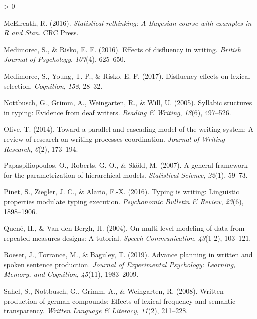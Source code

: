 \documentclass[
  english,
  man,mask,floatsintext]{apa7}
\newlength{\cslhangindent}
\newenvironment{CSLReferences}[2] %
 {%
  \setlength{\parindent}{0pt}
  \ifodd #1 \everypar{\setlength{\hangindent}{\cslhangindent}}\ignorespaces\fi
  \ifnum #2 > 0
  \setlength{\parskip}{#2\baselineskip}
  \fi
 }%
 {}
\begin{document}
\begin{CSLReferences}{1}{0}
\leavevmode\hypertarget{ref-mcelreath2016statistical}{}%
McElreath, R. (2016). \emph{Statistical rethinking: {A} {B}ayesian course with examples in {R} and {Stan}}. CRC Press.

\leavevmode\hypertarget{ref-medimorec2016effects}{}%
Medimorec, S., \& Risko, E. F. (2016). Effects of disfluency in writing. \emph{British Journal of Psychology}, \emph{107}(4), 625--650.

\leavevmode\hypertarget{ref-medimorec2017disfluency}{}%
Medimorec, S., Young, T. P., \& Risko, E. F. (2017). Disfluency effects on lexical selection. \emph{Cognition}, \emph{158}, 28--32.

\leavevmode\hypertarget{ref-not05}{}%
Nottbusch, G., Grimm, A., Weingarten, R., \& Will, U. (2005). Syllabic sructures in typing: Evidence from deaf writers. \emph{Reading \& Writing}, \emph{18}(6), 497--526.

\leavevmode\hypertarget{ref-olive2014toward}{}%
Olive, T. (2014). Toward a parallel and cascading model of the writing system: {A} review of research on writing processes coordination. \emph{Journal of Writing Research}, \emph{6}(2), 173--194.

\leavevmode\hypertarget{ref-papaspiliopoulos2007general}{}%
Papaspiliopoulos, O., Roberts, G. O., \& Sköld, M. (2007). A general framework for the parametrization of hierarchical models. \emph{Statistical Science}, \emph{22}(1), 59--73.

\leavevmode\hypertarget{ref-pinet2016typing}{}%
Pinet, S., Ziegler, J. C., \& Alario, F.-X. (2016). Typing is writing: Linguistic properties modulate typing execution. \emph{Psychonomic Bulletin \& Review}, \emph{23}(6), 1898--1906.

\leavevmode\hypertarget{ref-quene2004multi}{}%
Quené, H., \& Van den Bergh, H. (2004). On multi-level modeling of data from repeated measures designs: A tutorial. \emph{Speech Communication}, \emph{43}(1-2), 103--121.

\leavevmode\hypertarget{ref-roeser2019advance}{}%
Roeser, J., Torrance, M., \& Baguley, T. (2019). Advance planning in written and spoken sentence production. \emph{Journal of Experimental Psychology: Learning, Memory, and Cognition}, \emph{45}(11), 1983--2009.

\leavevmode\hypertarget{ref-sah08}{}%
Sahel, S., Nottbusch, G., Grimm, A., \& Weingarten, R. (2008). Written production of german compounds: Effects of lexical frequency and semantic transparency. \emph{Written Language \& Literacy}, \emph{11}(2), 211--228.


\end{CSLReferences}
\end{document}
